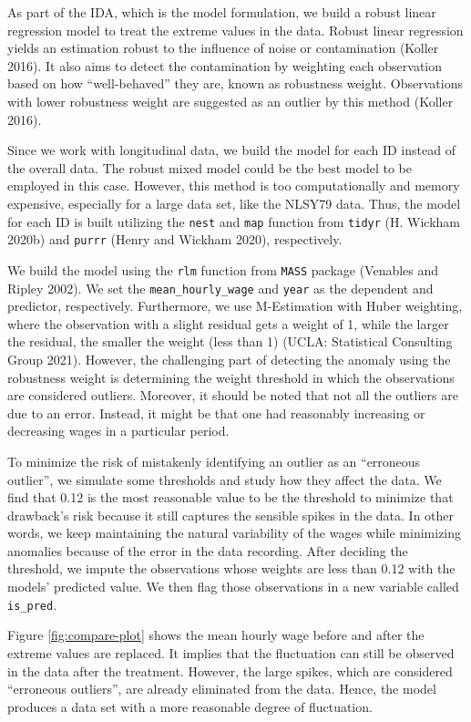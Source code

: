 \documentclass{article}
\begin{document}
As part of the IDA, which is the model formulation, we build a robust linear regression model to treat the extreme values in the data. Robust linear regression yields an estimation robust to the influence of noise or contamination (Koller 2016). It also aims to detect the contamination by weighting each observation based on how ``well-behaved'' they are, known as robustness weight. Observations with lower robustness weight are suggested as an outlier by this method (Koller 2016).

Since we work with longitudinal data, we build the model for each ID instead of the overall data. The robust mixed model could be the best model to be employed in this case. However, this method is too computationally and memory expensive, especially for a large data set, like the NLSY79 data. Thus, the model for each ID is built utilizing the \texttt{nest} and \texttt{map} function from \texttt{tidyr} (H. Wickham 2020b) and \texttt{purrr} (Henry and Wickham 2020), respectively.

We build the model using the \texttt{rlm} function from \texttt{MASS} package (Venables and Ripley 2002). We set the \texttt{mean\_hourly\_wage} and \texttt{year} as the dependent and predictor, respectively. Furthermore, we use M-Estimation with Huber weighting, where the observation with a slight residual gets a weight of 1, while the larger the residual, the smaller the weight (less than 1) (UCLA: Statistical Consulting Group 2021). However, the challenging part of detecting the anomaly using the robustness weight is determining the weight threshold in which the observations are considered outliers. Moreover, it should be noted that not all the outliers are due to an error. Instead, it might be that one had reasonably increasing or decreasing wages in a particular period.

To minimize the risk of mistakenly identifying an outlier as an ``erroneous outlier'', we simulate some thresholds and study how they affect the data. We find that 0.12 is the most reasonable value to be the threshold to minimize that drawback's risk because it still captures the sensible spikes in the data. In other words, we keep maintaining the natural variability of the wages while minimizing anomalies because of the error in the data recording. After deciding the threshold, we impute the observations whose weights are less than 0.12 with the models' predicted value. We then flag those observations in a new variable called \texttt{is\_pred}.

Figure \ref{fig:compare-plot} shows the mean hourly wage before and after the extreme values are replaced. It implies that the fluctuation can still be observed in the data after the treatment. However, the large spikes, which are considered ``erroneous outliers'', are already eliminated from the data. Hence, the model produces a data set with a more reasonable degree of fluctuation.
\end{document}
